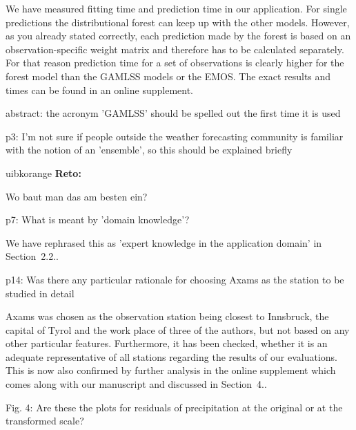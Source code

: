\documentclass[american,foldmarks=false,noconfig]{uibklttr}
\newenvironment{review}{\fontshape{\itdefault}\fontseries{\bfdefault} \selectfont \smallskip}{\par}
\newenvironment{reto}{
    \begin{color}{uibkorange}
    \textbf{Reto:~}
        \itshape
}{
    \end{color}
}
\begin{document}
We have measured fitting time and prediction time in our 
application. For single predictions the distributional forest 
can keep up with the other models. However, as you already 
stated correctly, each prediction made by the forest is based 
on an observation-specific weight matrix and therefore has to 
be calculated separately. For that reason prediction time for a 
set of observations is clearly higher for the forest model than 
the GAMLSS models or the EMOS. The exact results and times can 
be found in an online supplement.


\begin{review}
abstract: the acronym 'GAMLSS' should be spelled out the first 
time it is used
\end{review}

\begin{review}
p3: I'm not sure if people outside the weather forecasting 
community is familiar with the notion of an 'ensemble', so 
this should be explained briefly
\end{review}

\begin{reto}
Wo baut man das am besten ein?
\end{reto}


\begin{review}
p7: What is meant by 'domain knowledge'?
\end{review}

We have rephrased this as 'expert knowledge in the application domain'
in Section~2.2..


\begin{review}
p14: Was there any particular rationale for choosing Axams 
as the station to be studied in detail
\end{review}

Axams was chosen as the observation station being closest 
to Innsbruck, the capital of Tyrol and the work place of 
three of the authors, but not based on any other particular 
features. Furthermore, it has been checked, whether it 
is an adequate representative of all stations regarding 
the results of our evaluations. This is now also 
confirmed by further analysis in the online supplement which
comes along with our manuscript and discussed in Section~4..

\begin{review}
Fig. 4: Are these the plots for residuals of precipitation 
at the original or at the transformed scale?
\end{review}
\end{document}
